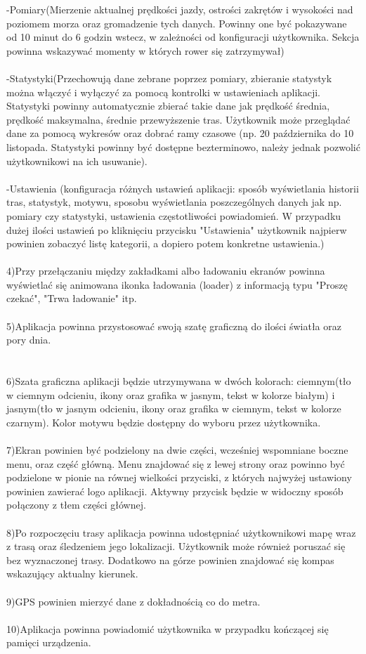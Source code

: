 -Pomiary(Mierzenie aktualnej prędkości jazdy, ostrości zakrętów i wysokości nad poziomem morza oraz gromadzenie tych danych. Powinny one być pokazywane od 10 minut do 6 godzin wstecz, w zależności od konfiguracji użytkownika. Sekcja powinna wskazywać momenty w których rower się zatrzymywał)\\\\
-Statystyki(Przechowują dane zebrane poprzez pomiary, zbieranie statystyk można włączyć i wyłączyć za pomocą kontrolki w ustawieniach aplikacji. Statystyki powinny automatycznie zbierać takie dane jak prędkość średnia, prędkość maksymalna, średnie przewyższenie tras. Użytkownik może przeglądać dane za pomocą wykresów oraz dobrać ramy czasowe (np. 20 października do 10 listopada. Statystyki powinny być dostępne bezterminowo, należy jednak pozwolić użytkownikowi na ich usuwanie).\\\\
-Ustawienia (konfiguracja różnych ustawień aplikacji: sposób wyświetlania historii tras, statystyk, motywu, sposobu wyświetlania poszczególnych danych jak np. pomiary czy statystyki, ustawienia częstotliwości powiadomień. W przypadku dużej ilości ustawień po kliknięciu przycisku "Ustawienia" użytkownik najpierw powinien zobaczyć listę kategorii, a dopiero potem konkretne ustawienia.)\\\\
4)Przy przełączaniu między zakładkami albo ładowaniu ekranów powinna wyświetlać się animowana ikonka ładowania (loader) z informacją typu "Proszę czekać", "Trwa ładowanie" itp.\\\\
5)Aplikacja powinna przystosować swoją szatę graficzną do ilości światła oraz pory dnia.\\\\\\
6)Szata graficzna aplikacji będzie utrzymywana w dwóch kolorach: ciemnym(tło w ciemnym odcieniu, ikony oraz grafika w jasnym, tekst w kolorze białym) i jasnym(tło w jasnym odcieniu, ikony oraz grafika w ciemnym, tekst w kolorze czarnym). Kolor motywu będzie dostępny do wyboru przez użytkownika. \\\\
7)Ekran powinien być podzielony na dwie części, wcześniej wspomniane boczne menu, oraz część główną. Menu znajdować się z lewej strony oraz powinno być podzielone w pionie na równej wielkości przyciski, z których najwyżej ustawiony powinien zawierać logo aplikacji. Aktywny przycisk będzie w widoczny sposób połączony z tłem części głównej.\\\\
8)Po rozpoczęciu trasy aplikacja powinna udostępniać użytkownikowi mapę wraz z trasą oraz śledzeniem jego lokalizacji. Użytkownik może również poruszać się bez wyznaczonej trasy. Dodatkowo na górze powinien znajdować się kompas wskazujący aktualny kierunek. \\\\
9)GPS powinien mierzyć dane z dokładnością co do metra.\\\\
10)Aplikacja powinna powiadomić użytkownika w przypadku kończącej się pamięci urządzenia.\\\\